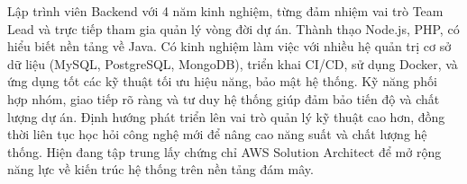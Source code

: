 

\begin{cvparagraph}
    \quad
    Lập trình viên Backend với 4 năm kinh nghiệm, từng đảm nhiệm vai trò Team Lead và trực tiếp tham gia quản lý vòng đời dự án. Thành thạo Node.js, PHP, có hiểu biết nền tảng về Java. Có kinh nghiệm làm việc với nhiều hệ quản trị cơ sở dữ liệu (MySQL, PostgreSQL, MongoDB), triển khai CI/CD, sử dụng Docker, và ứng dụng tốt các kỹ thuật tối ưu hiệu năng, bảo mật hệ thống. Kỹ năng phối hợp nhóm, giao tiếp rõ ràng và tư duy hệ thống giúp đảm bảo tiến độ và chất lượng dự án.
    \vspace{0.5em} %
    \newline \hspace*{1em} Định hướng phát triển lên vai trò quản lý kỹ thuật cao hơn, đồng thời liên tục học hỏi công nghệ mới để nâng cao năng suất và chất lượng hệ thống. Hiện đang tập trung lấy chứng chỉ AWS Solution Architect để mở rộng năng lực về kiến trúc hệ thống trên nền tảng đám mây.
\end{cvparagraph}
